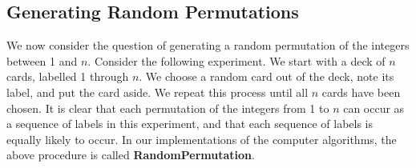 \subsection*{Generating Random Permutations}
We now consider the question of generating a random permutation of the integers between 1 and
$n$.  Consider the following experiment.  We start with a deck of $n$ cards, labelled 1
through $n$.  We choose a random card out of the deck, note its label, and put the card
aside.  We repeat this process until all $n$ cards have been chosen.  It is clear that each
permutation of the integers from 1 to $n$ can occur as a sequence of labels in this experiment,
and that each sequence of labels is equally likely to occur.  In our implementations of the
computer algorithms, the above procedure is called {\bf
RandomPermutation}.  



